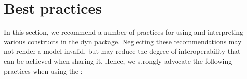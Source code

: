
\section{Best practices}
\label{best-practices}

In this section, we recommend a number of practices for using and interpreting various constructs in the dyn package. Neglecting these recommendations may not render a model invalid, but may reduce the degree of interoperability that can be achieved when sharing it. Hence, we strongly advocate the following practices when using the \sbmlthreedynamic:

